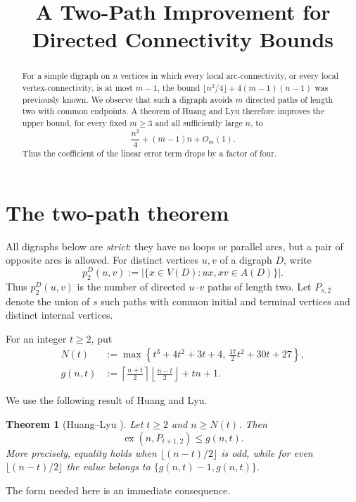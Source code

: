 \documentclass[10pt]{amsart}
\title[A sharper directed-connectivity bound]
{A Two-Path Improvement for Directed Connectivity Bounds}
\author{}
\date{}
\newtheorem{theorem}{Theorem}
\theoremstyle{remark}
\newcommand{\ex}{\operatorname{ex}}
\begin{document}
\begin{abstract}
For a simple digraph on $n$ vertices in which every local arc-connectivity,
or every local vertex-connectivity, is at most $m-1$, the bound
$\lfloor n^2/4\rfloor+4(m-1)(n-1)$ was previously known.
We observe that such a digraph avoids $m$ directed paths of length two with
common endpoints.  A theorem of Huang and Lyu therefore improves the upper
bound, for every fixed $m\ge 3$ and all sufficiently large $n$, to
\[
  \frac{n^2}{4}+(m-1)n+O_m(1).
\]
Thus the coefficient of the linear error term drops by a factor of four.
\end{abstract}

\maketitle

\section{The two-path theorem}

All digraphs below are \emph{strict}: they have no loops or parallel arcs,
but a pair of opposite arcs is allowed.  For distinct vertices $u,v$ of a
digraph $D$, write
\[
  p_2^D(u,v)
  :=\bigl|\{x\in V(D): ux,xv\in A(D)\}\bigr|.
\]
Thus $p_2^D(u,v)$ is the number of directed $u$--$v$ paths of length two.
Let $P_{s,2}$ denote the union of $s$ such paths with common initial and
terminal vertices and distinct internal vertices.

For an integer $t\ge2$, put
\begin{align*}
 N(t)&:=\max\left\{
 t^3+4t^2+3t+4,\,
 \frac{17}{2}t^2+30t+27
 \right\},\\
 g(n,t)&:=
 \left\lceil\frac{n+t}{2}\right\rceil
 \left\lfloor\frac{n-t}{2}\right\rfloor
 +tn+1.
\end{align*}

We use the following result of Huang and Lyu.

\begin{theorem}[Huang--Lyu \cite{HuangLyu}]
\label{thm:huang-lyu}
Let $t\ge2$ and $n\ge N(t)$.  Then
\[
  \ex(n,P_{t+1,2})\le g(n,t).
\]
More precisely, equality holds when
$\lfloor(n-t)/2\rfloor$ is odd, while for even
$\lfloor(n-t)/2\rfloor$ the value belongs to
$\{g(n,t)-1,g(n,t)\}$.
\end{theorem}

The form needed here is an immediate consequence.
\end{document}

